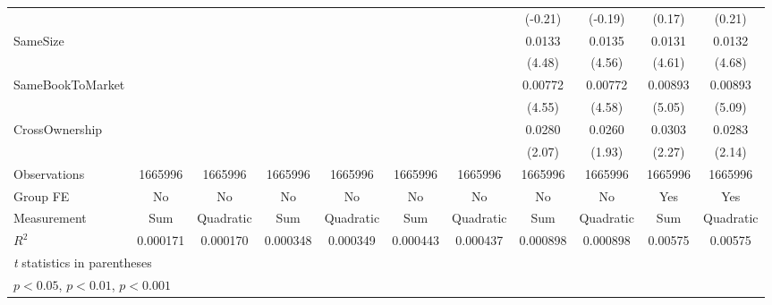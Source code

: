 {\begin{tabular}{l*{10}{c}}
                &                  &                  &                  &                  &                  &                  &  (-0.21)         &  (-0.19)         &   (0.17)         &   (0.21)         \\
[1em]
SameSize        &                  &                  &                  &                  &                  &                  &   0.0133\sym{***}&   0.0135\sym{***}&   0.0131\sym{***}&   0.0132\sym{***}\\
                &                  &                  &                  &                  &                  &                  &   (4.48)         &   (4.56)         &   (4.61)         &   (4.68)         \\
[1em]
SameBookToMarket&                  &                  &                  &                  &                  &                  &  0.00772\sym{***}&  0.00772\sym{***}&  0.00893\sym{***}&  0.00893\sym{***}\\
                &                  &                  &                  &                  &                  &                  &   (4.55)         &   (4.58)         &   (5.05)         &   (5.09)         \\
[1em]
CrossOwnership  &                  &                  &                  &                  &                  &                  &   0.0280\sym{*}  &   0.0260         &   0.0303\sym{*}  &   0.0283\sym{*}  \\
                &                  &                  &                  &                  &                  &                  &   (2.07)         &   (1.93)         &   (2.27)         &   (2.14)         \\
\hline
Observations    &  1665996         &  1665996         &  1665996         &  1665996         &  1665996         &  1665996         &  1665996         &  1665996         &  1665996         &  1665996         \\
Group FE        &       No         &       No         &       No         &       No         &       No         &       No         &       No         &       No         &      Yes         &      Yes         \\
Measurement     &      Sum         &Quadratic         &      Sum         &Quadratic         &      Sum         &Quadratic         &      Sum         &Quadratic         &      Sum         &Quadratic         \\
$ R^2 $         & 0.000171         & 0.000170         & 0.000348         & 0.000349         & 0.000443         & 0.000437         & 0.000898         & 0.000898         &  0.00575         &  0.00575         \\
\hline\hline
\multicolumn{11}{l}{\footnotesize \textit{t} statistics in parentheses}\\
\multicolumn{11}{l}{\footnotesize \sym{*} \(p<0.05\), \sym{**} \(p<0.01\), \sym{***} \(p<0.001\)}\\
\end{tabular}
}
